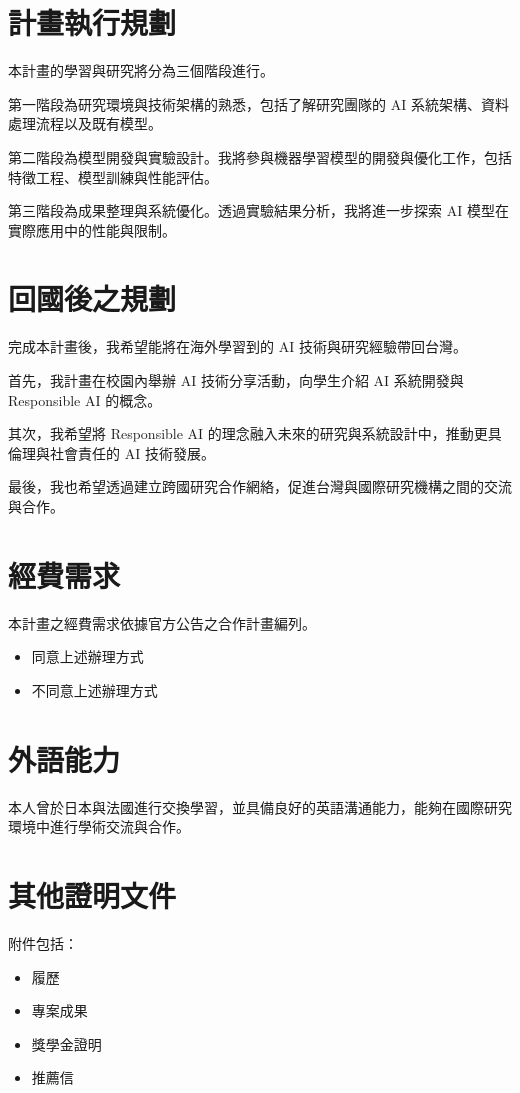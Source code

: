 \documentclass[12pt,a4paper]{article}
\begin{document}
\section{計畫執行規劃}

本計畫的學習與研究將分為三個階段進行。

第一階段為研究環境與技術架構的熟悉，包括了解研究團隊的 AI 系統架構、資料處理流程以及既有模型。

第二階段為模型開發與實驗設計。我將參與機器學習模型的開發與優化工作，包括特徵工程、模型訓練與性能評估。

第三階段為成果整理與系統優化。透過實驗結果分析，我將進一步探索 AI 模型在實際應用中的性能與限制。

\section{回國後之規劃}

完成本計畫後，我希望能將在海外學習到的 AI 技術與研究經驗帶回台灣。

首先，我計畫在校園內舉辦 AI 技術分享活動，向學生介紹 AI 系統開發與 Responsible AI 的概念。

其次，我希望將 Responsible AI 的理念融入未來的研究與系統設計中，推動更具倫理與社會責任的 AI 技術發展。

最後，我也希望透過建立跨國研究合作網絡，促進台灣與國際研究機構之間的交流與合作。

\section{經費需求}

本計畫之經費需求依據官方公告之合作計畫編列。

\begin{itemize}
\item [$\boxtimes$] 同意上述辦理方式
\item [$\square$] 不同意上述辦理方式
\end{itemize}

\section{外語能力}

本人曾於日本與法國進行交換學習，並具備良好的英語溝通能力，能夠在國際研究環境中進行學術交流與合作。

\section{其他證明文件}

附件包括：

\begin{itemize}
\item 履歷
\item 專案成果
\item 獎學金證明
\item 推薦信
\end{itemize}
\end{document}
